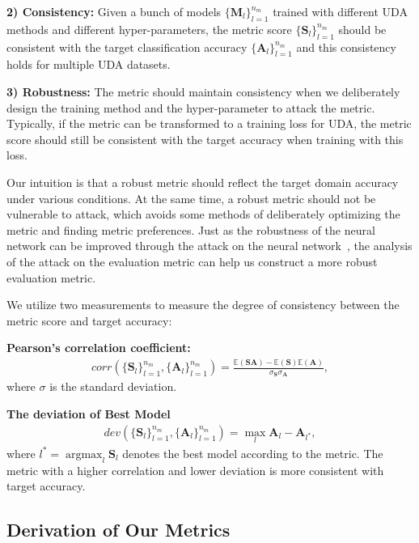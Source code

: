 \documentclass{article} %
\begin{document}
\textbf{2) Consistency:} Given a bunch of models $\{\boldsymbol{M}_l\}_{l=1}^{n_m}$ trained with different UDA methods and different hyper-parameters, the metric score $\{\boldsymbol{S}_l\}_{l=1}^{n_m}$ should be consistent with the target classification accuracy $\{\boldsymbol{A}_l\}_{l=1}^{n_m}$ and this consistency holds for multiple UDA datasets. 

\textbf{3) Robustness:} The metric should maintain consistency when we deliberately design the training method and the hyper-parameter to attack the metric. Typically, if the metric can be transformed to a training loss for UDA, the metric score should still be consistent with the target accuracy when training with this loss. 

Our intuition is that a robust metric should reflect the target domain accuracy under various conditions. At the same time, a robust metric should not be vulnerable to attack, which avoids some methods of deliberately optimizing the metric and finding metric preferences. Just as the robustness of the neural network can be improved through the attack on the neural network~\cite{AdversarialExamples}, the analysis of the attack on the evaluation metric can help us construct a more robust evaluation metric.

We utilize two measurements to measure the degree of consistency between the metric score and target accuracy: 

\textbf{Pearson's correlation coefficient:}
\begin{align}
corr(\{\boldsymbol{S}_l\}_{l=1}^{n_m}, \{\boldsymbol{A}_l\}_{l=1}^{n_m}) = \frac{\mathbb{E}(\boldsymbol{S}\boldsymbol{A})-\mathbb{E}(\boldsymbol{S})\mathbb{E}(\boldsymbol{A})}{\sigma_{\boldsymbol{S}}\sigma_{\boldsymbol{A}}},
\label{eq:corr}
\end{align}
where $\sigma$ is the standard deviation.

\textbf{The deviation of Best Model}
\begin{align}
dev(\{\boldsymbol{S}_l\}_{l=1}^{n_m}, \{\boldsymbol{A}_l\}_{l=1}^{n_m}) = \max_l \boldsymbol{A}_l-\boldsymbol{A}_{l^*},
\label{eq:dev}
\end{align}
where $l^*=\operatorname{argmax}_l \boldsymbol{S}_l$ denotes the best model according to the metric. The metric with a higher correlation and lower deviation is more consistent with target accuracy.

\subsection{Derivation of Our Metrics}
\end{document}
